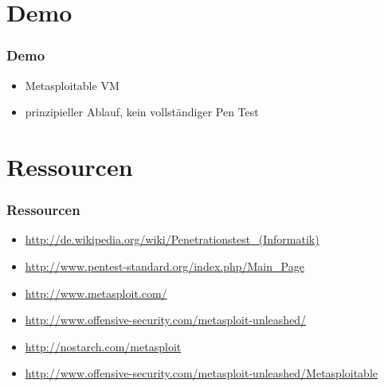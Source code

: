 \documentclass[11pt]{beamer}
\begin{document}
\section{Demo}
\label{sec-4}
\begin{frame}[fragile]\frametitle{Demo}
\label{sec-4-1}
\begin{itemize}

\item Metasploitable VM\\
\label{sec-4-1-1}%
\item prinzipieller Ablauf, kein vollständiger Pen Test\\
\label{sec-4-1-2}%
\end{itemize} %
\end{frame}
\section{Ressourcen}
\label{sec-5}
\begin{frame}[fragile]\frametitle{Ressourcen}
\label{sec-5-1}
\begin{itemize}

\item \href{http://de.wikipedia.org/wiki/Penetrationstest_(Informatik)}{http://de.wikipedia.org/wiki/Penetrationstest\_(Informatik)}\\
\label{sec-5-1-1}%
\item \href{http://www.pentest-standard.org/index.php/Main_Page}{http://www.pentest-standard.org/index.php/Main\_Page}\\
\label{sec-5-1-2}%
\item \href{http://www.metasploit.com/}{http://www.metasploit.com/}\\
\label{sec-5-1-3}%
\item \href{http://www.offensive-security.com/metasploit-unleashed/}{http://www.offensive-security.com/metasploit-unleashed/}\\
\label{sec-5-1-4}%
\item \href{http://nostarch.com/metasploit}{http://nostarch.com/metasploit}\\
\label{sec-5-1-5}%
\item \href{http://www.offensive-security.com/metasploit-unleashed/Metasploitable}{http://www.offensive-security.com/metasploit-unleashed/Metasploitable}\\
\label{sec-5-1-6}%
\end{itemize} %
\end{frame}
\end{document}
